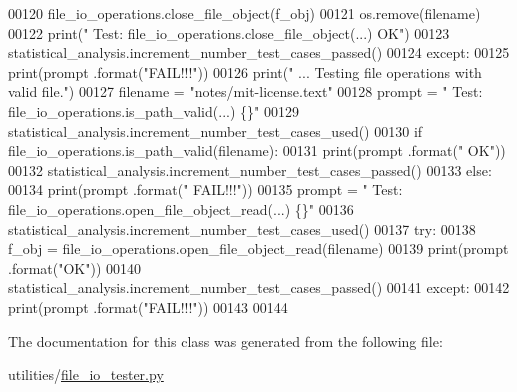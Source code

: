 \begin{DoxyCode}
00120             file\_io\_operations.close\_file\_object(f\_obj)
00121             os.remove(filename)
00122             print(\textcolor{stringliteral}{" Test: file\_io\_operations.close\_file\_object(...)     OK"})
00123             statistical\_analysis.increment\_number\_test\_cases\_passed()
00124         \textcolor{keywordflow}{except}:
00125             print(prompt .format(\textcolor{stringliteral}{"FAIL!!!"}))
00126         print(\textcolor{stringliteral}{" ... Testing file operations with valid file."})
00127         filename = \textcolor{stringliteral}{"notes/mit-license.text"}
00128         prompt = \textcolor{stringliteral}{"  Test: file\_io\_operations.is\_path\_valid(...) \{\}"}
00129         statistical\_analysis.increment\_number\_test\_cases\_used()
00130         \textcolor{keywordflow}{if} file\_io\_operations.is\_path\_valid(filename):
00131             print(prompt .format(\textcolor{stringliteral}{"  OK"}))
00132             statistical\_analysis.increment\_number\_test\_cases\_passed()
00133         \textcolor{keywordflow}{else}:
00134             print(prompt .format(\textcolor{stringliteral}{"  FAIL!!!"}))
00135         prompt = \textcolor{stringliteral}{"  Test: file\_io\_operations.open\_file\_object\_read(...) \{\}"}
00136         statistical\_analysis.increment\_number\_test\_cases\_used()
00137         \textcolor{keywordflow}{try}:
00138             f\_obj = file\_io\_operations.open\_file\_object\_read(filename)
00139             print(prompt .format(\textcolor{stringliteral}{"OK"}))
00140             statistical\_analysis.increment\_number\_test\_cases\_passed()
00141         \textcolor{keywordflow}{except}:
00142             print(prompt .format(\textcolor{stringliteral}{"FAIL!!!"}))
00143         
00144 \end{DoxyCode}


The documentation for this class was generated from the following file\+:\begin{DoxyCompactItemize}
\item 
utilities/\hyperlink{file__io__tester_8py}{file\+\_\+io\+\_\+tester.\+py}\end{DoxyCompactItemize}
